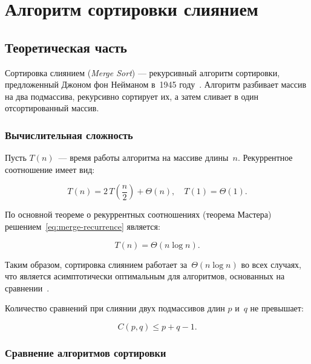\chapter{Алгоритм сортировки слиянием}

\section{Теоретическая часть}

Сортировка слиянием (\textit{Merge Sort}) — рекурсивный алгоритм сортировки,
предложенный Джоном фон Нейманом в~1945 году~\cite{knuth1997}. Алгоритм
разбивает массив на два подмассива, рекурсивно сортирует их, а затем
сливает в один отсортированный массив.

\subsection{Вычислительная сложность}

Пусть \(T(n)\)~--- время работы алгоритма на массиве длины~\(n\).
Рекуррентное соотношение имеет вид:

\begin{equation}
  \label{eq:merge-recurrence}
  T(n) = 2\,T\!\left(\frac{n}{2}\right) + \Theta(n),
  \quad T(1) = \Theta(1).
\end{equation}

По основной теореме о рекуррентных соотношениях (теорема Мастера)
решением~\eqref{eq:merge-recurrence} является:

\begin{equation}
  \label{eq:merge-complexity}
  T(n) = \Theta(n \log n).
\end{equation}

Таким образом, сортировка слиянием работает за~\(\Theta(n \log n)\) во всех
случаях, что является асимптотически оптимальным для алгоритмов, основанных
на сравнении~\cite{cormen2022}.

Количество сравнений при слиянии двух подмассивов длин \(p\) и~\(q\)
не превышает:

\begin{equation}
  \label{eq:merge-comparisons}
  C(p, q) \leq p + q - 1.
\end{equation}

\subsection{Сравнение алгоритмов сортировки}

